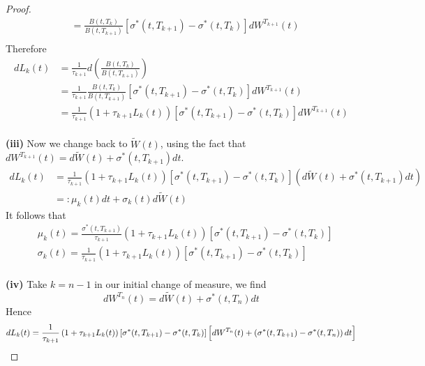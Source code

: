 \documentclass[a4paper, 10pt]{article}
\theoremstyle{definition}
\theoremstyle{hSol}
\begin{document}
\begin{proof}
\begin{equation}
\begin{split}
     &= \frac{B(t,T_k)}{B(t,T_{k+1})}\left[\sigma^*(t,T_{k+1})-\sigma^*(t,T_{k})\right] dW^{T_{k+1}}(t)\\
  \end{split}
\end{equation}
Therefore
\begin{equation}
  \begin{split}
    dL_k(t) &= \frac{1}{\tau_{k+1}} d\left(\frac{B(t,T_k)}{B(t,T_{k+1})}\right) \\
    &=\frac{1}{\tau_{k+1}}\frac{B(t,T_k)}{B(t,T_{k+1})}\left[\sigma^*(t,T_{k+1})-\sigma^*(t,T_{k})\right] dW^{T_{k+1}}(t) \\
    &=\frac{1}{\tau_{k+1}}\left(1+\tau_{k+1}L_k(t)\right)\left[\sigma^*(t,T_{k+1})-\sigma^*(t,T_{k})\right] dW^{T_{k+1}}(t)
  \end{split}
\end{equation}
~\\
\textbf{(iii)} Now we change back to $\widetilde{W}(t)$, using the fact that $dW^{T_{k+1}}(t) =  d\widetilde{W}(t) + \sigma^*(t,T_{k+1}) dt$.
\begin{equation}
  \begin{split}
    dL_k(t) &=\frac{1}{\tau_{k+1}}\left(1+\tau_{k+1}L_k(t)\right)\left[\sigma^*(t,T_{k+1})-\sigma^*(t,T_{k})\right] (d\widetilde{W}(t) + \sigma^*(t,T_{k+1}) dt) \\
    &=: \mu_k(t) dt + \sigma_k(t) d\widetilde{W}(t)
  \end{split}
\end{equation}
It follows that
\begin{equation}
  \begin{split}
    &\mu_k(t) = \frac{\sigma^*(t,T_{k+1})}{\tau_{k+1}}\left(1+\tau_{k+1}L_k(t)\right)\left[\sigma^*(t,T_{k+1})-\sigma^*(t,T_{k})\right]\\
    &\sigma_k(t) = \frac{1}{\tau_{k+1}}\left(1+\tau_{k+1}L_k(t)\right)\left[\sigma^*(t,T_{k+1})-\sigma^*(t,T_{k})\right]
  \end{split}
\end{equation}
~\\
\textbf{(iv)} Take $k=n-1$ in our initial change of measure, we find
\begin{equation}
  dW^{T_{n}}(t) =  d\widetilde{W}(t) + \sigma^*(t,T_{n}) dt
\end{equation}
Hence
\begin{equation}
  dL_k(t) =\frac{1}{\tau_{k+1}}\left(1+\tau_{k+1}L_k(t)\right)\left[\sigma^*(t,T_{k+1})-\sigma^*(t,T_{k})\right] \Big[dW^{T_{n}}(t) +  \left(\sigma^*(t,T_{k+1})-\sigma^*(t,T_{n})\right) dt\Big] \\

\end{equation}
\end{proof}
\end{document}
